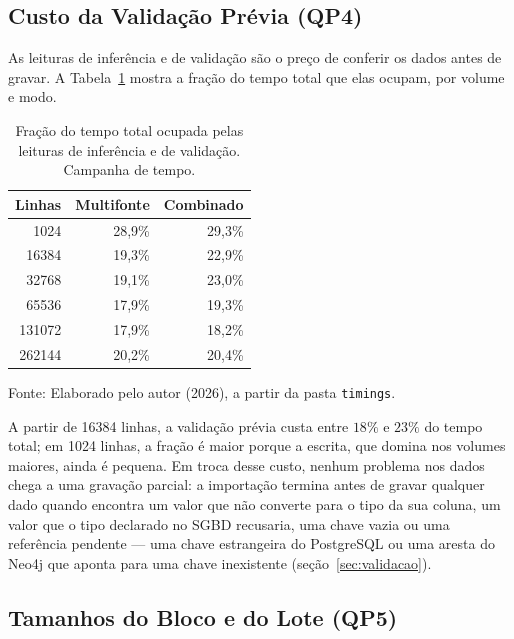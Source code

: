 \subsection{Custo da Validação Prévia (QP4)}
\label{sec:res-validacao}

As leituras de inferência e de validação são o preço de conferir os dados antes de gravar.
A Tabela~\ref{tab:custo-validacao} mostra a fração do tempo total que elas ocupam, por
volume e modo.

\begin{table}[H]
  \caption{Fração do tempo total ocupada pelas leituras de inferência e de validação. Campanha de tempo.}
  \label{tab:custo-validacao}
  \centering
  \begin{tabular}{r r r}
    \toprule
    \textbf{Linhas} & \textbf{Multifonte} & \textbf{Combinado} \\
    \midrule
    \num{1024}   & 28{,}9\% & 29{,}3\% \\
    \num{16384}  & 19{,}3\% & 22{,}9\% \\
    \num{32768}  & 19{,}1\% & 23{,}0\% \\
    \num{65536}  & 17{,}9\% & 19{,}3\% \\
    \num{131072} & 17{,}9\% & 18{,}2\% \\
    \num{262144} & 20{,}2\% & 20{,}4\% \\
    \bottomrule
  \end{tabular}
  \par\vspace{4pt}
  {\footnotesize Fonte: Elaborado pelo autor (2026), a partir da pasta \texttt{timings}.}
\end{table}

A partir de \num{16384} linhas, a validação prévia custa entre $18\%$ e $23\%$ do tempo
total; em \num{1024} linhas, a fração é maior porque a escrita, que
domina nos volumes maiores, ainda é pequena. Em troca desse custo, nenhum problema nos
dados chega a uma gravação parcial: a importação termina antes de gravar qualquer dado
quando encontra um valor que não converte para o tipo da sua coluna, um valor que o tipo
declarado no SGBD recusaria, uma chave vazia ou uma referência pendente --- uma chave
estrangeira do PostgreSQL ou uma aresta do Neo4j que aponta para uma chave inexistente
(seção~\ref{sec:validacao}).

\subsection{Tamanhos do Bloco e do Lote (QP5)}
\label{sec:res-bloco}

